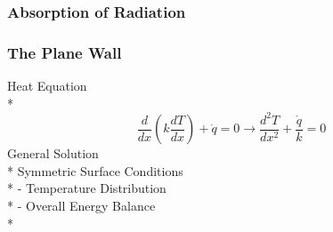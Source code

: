 \documentclass[10pt,landscape]{article}
\begin{document}
\begin{multicols}{3}
\subsubsection{Absorption of Radiation}
\subsubsection{The Plane Wall}
Heat Equation\\*
\begin{equation}
    \frac{d}{dx}(k\frac{dT}{dx})+\dot{q}=0\rightarrow\frac{d^2T}{dx^2}+\frac{\dot{q}}{k}=0
\end{equation}
General Solution\\*
Symmetric Surface Conditions\\*
- Temperature Distribution\\*
- Overall Energy Balance\\*

\end{multicols}
\end{document}
